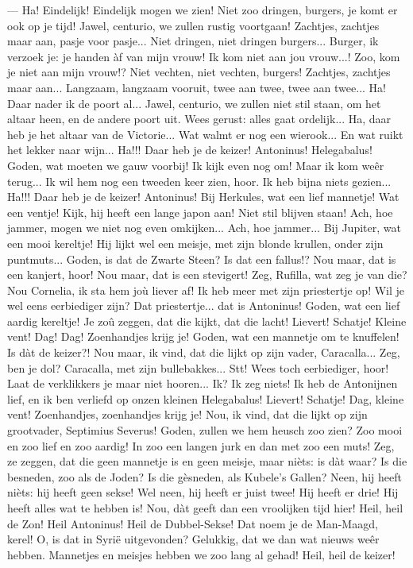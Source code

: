 \documentclass[a4paper, 12pt, oneside, dutch]{article}
\begin{document}
--- Ha! Eindelijk! Eindelijk mogen we zien! Niet zoo dringen, burgers, je komt er ook op je tijd! Jawel, centurio, we zullen rustig voortgaan! Zachtjes, zachtjes maar aan, pasje voor pasje... Niet dringen, niet dringen burgers... Burger, ik verzoek je: je handen àf van mijn vrouw! Ik kom niet aan jou vrouw...! Zoo, kom je niet aan mijn vrouw!? Niet vechten, niet vechten, burgers! Zachtjes, zachtjes maar aan... Langzaam, langzaam vooruit, twee aan twee, twee aan twee... Ha! Daar nader ik de poort al... Jawel, centurio, we zullen niet stil staan, om het altaar heen, en de andere poort uit. Wees gerust: alles gaat ordelijk... Ha, daar heb je het altaar van de Victorie... Wat walmt er nog een wierook... En wat ruikt het lekker naar wijn... Ha!!! Daar heb je de keizer! Antoninus! Helegabalus! Goden, wat moeten we gauw voorbij! Ik kijk even nog om! Maar ik kom weêr terug... Ik wil hem nog een tweeden keer zien, hoor. Ik heb bijna niets gezien... Ha!!! Daar heb je de keizer! Antoninus! Bij Herkules, wat een lief mannetje! Wat een ventje! Kijk, hij heeft een lange japon aan! Niet stil blijven staan! Ach, hoe jammer, mogen we niet nog even omkijken... Ach, hoe jammer... Bij Jupiter, wat een mooi kereltje! Hij lijkt wel een meisje, met zijn blonde krullen, onder zijn puntmuts... Goden, is dat de Zwarte Steen? Is dat een fallus!? Nou maar, dat is een kanjert, hoor! Nou maar, dat is een stevigert! Zeg, Rufilla, wat zeg je van die? Nou Cornelia, ik sta hem joù liever af! Ik heb meer met zijn priestertje op! Wil je wel eens eerbiediger zijn? Dat priestertje... dat is Antoninus! Goden, wat een lief aardig kereltje! Je zoû zeggen, dat die kijkt, dat die lacht! Lievert! Schatje! Kleine vent! Dag! Dag! Zoenhandjes krijg je! Goden, wat een mannetje om te knuffelen! Is dàt de keizer?! Nou maar, ik vind, dat die lijkt op zijn vader, Caracalla... Zeg, ben je dol? Caracalla, met zijn bullebakkes... Stt! Wees toch eerbiediger, hoor! Laat de verklikkers je maar niet hooren... Ik? Ik zeg niets! Ik heb de Antonijnen lief, en ik ben verliefd op onzen kleinen Helegabalus! Lievert! Schatje! Dag, kleine vent! Zoenhandjes, zoenhandjes krijg je! Nou, ik vind, dat die lijkt op zijn grootvader, Septimius Severus! Goden, zullen we hem heusch zoo zien? Zoo mooi en zoo lief en zoo aardig! In zoo een langen jurk en dan met zoo een muts! Zeg, ze zeggen, dat die geen mannetje is en geen meisje, maar nièts: is dàt waar? Is die besneden, zoo als de Joden? Is die gèsneden, als Kubele's Gallen? Neen, hij heeft nièts: hij heeft geen sekse! Wel neen, hij heeft er juist twee! Hij heeft er drie! Hij heeft alles wat te hebben is! Nou, dàt geeft dan een vroolijken tijd hier! Heil, heil de Zon! Heil Antoninus! Heil de Dubbel-Sekse! Dat noem je de Man-Maagd, kerel! O, is dat in Syrië uitgevonden? Gelukkig, dat we dan wat nieuws weêr hebben. Mannetjes en meisjes hebben we zoo lang al gehad! Heil, heil de keizer!
\end{document}
